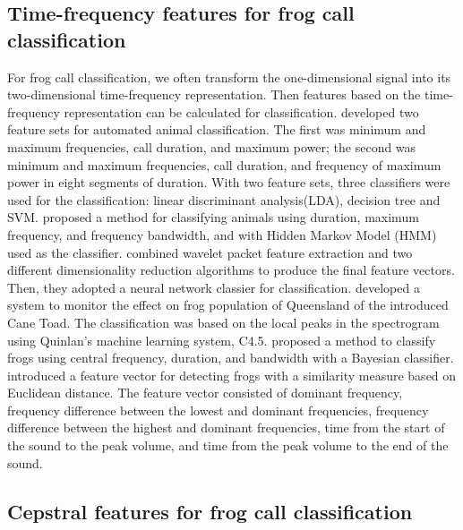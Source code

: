 \subsection{Time-frequency features for frog call classification}

For frog call classification, we often transform the one-dimensional signal into its two-dimensional time-frequency representation. Then features based on the time-frequency representation can be calculated for classification.
\cite{acevedo2009automated} developed two feature sets for automated animal classification. The first was minimum and maximum frequencies, call duration, and maximum power; the second was minimum and maximum frequencies, call duration, and frequency of maximum power in eight segments of duration. With two feature sets, three classifiers were used for the classification: linear discriminant analysis(LDA), decision tree and SVM. \cite{brandes2008feature} proposed a method for classifying animals using duration, maximum frequency, and frequency bandwidth, and with Hidden Markov Model (HMM) used as the classifier.  \cite{yen2002automatic} combined wavelet packet feature extraction and two different dimensionality reduction algorithms to produce the final feature vectors. Then, they adopted a neural network classier for classification. \cite{grigg1996monitoring} developed a system to monitor the effect on frog population of Queensland of the introduced Cane Toad. The classification was based on the local peaks in the spectrogram using Quinlan's machine learning system, C4.5. \cite{Brandes2006} proposed a method to classify frogs using central frequency, duration, and bandwidth with a Bayesian classifier. \cite{croker2012using} introduced a feature vector for detecting frogs with a similarity measure based on Euclidean distance. The feature vector consisted of dominant frequency, frequency difference between the lowest and dominant frequencies, frequency difference between the highest and dominant frequencies, time from the start of the sound to the peak volume, and time from the peak volume to the end of the sound. 
 


\subsection{Cepstral features for frog call classification}

